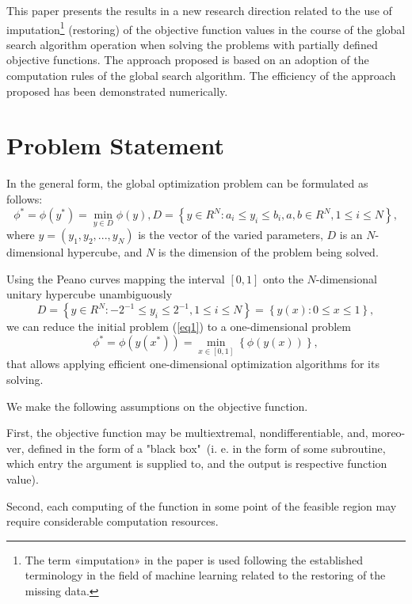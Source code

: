 \documentclass[runningheads]{llncs}
\begin{document}
This paper presents the results in a new research direction related to the use of imputation\footnote{The term «imputation» in the paper is used following the established terminology in the field of machine learning related to the restoring of the missing data.} (restoring) of the objective function values in the course of the global search algorithm operation when solving the problems with partially defined objective functions. The approach proposed is based on an adoption of the computation rules of the global search algorithm. The efficiency of the approach proposed has been demonstrated numerically.

\section{Problem Statement}
In the general form, the global optimization problem can be formulated as follows:
\begin{equation}\label{eq1} 
\phi^*=\phi(y^* )=\min_{y \in D} \phi(y), D=\left\{ y \in R^N: a_i \leq y_i \leq b_i, a,b \in R^N,1 \leq i \leq N \right\},
\end{equation}
where $y=(y_1,y_2,...,y_N)$ is the vector of the varied parameters, $D$ is an $N$-dimensional hypercube, and $N$ is the dimension of the problem being solved.

Using the Peano curves mapping the interval $[0,1]$ onto the $N$-dimensional unitary hypercube unambiguously
$$
D=\left\{ y \in R^N: -2^{-1} \leq y_i \leq 2^{-1}, 1 \leq i \leq N \right\} = \left\{ y(x): 0 \leq x \leq 1 \right\},
$$
we can reduce the initial problem (\ref{eq1}) to a one-dimensional problem
\begin{equation}\label{eq2} 
\phi^*=\phi(y(x^* ))=\min_{x \in [0,1]} \left\{ \phi(y(x)) \right\},
\end{equation}
that allows applying efficient one-dimensional optimization algorithms for its solving.

We make the following assumptions on the objective function. 

First, the objective function may be multiextremal, nondifferentiable, and, moreo-ver, defined in the form of a "black box"\ (i. e. in the form of some subroutine, which entry the argument is supplied to, and the output is respective function value).

Second, each computing of the function in some point of the feasible region may require considerable computation resources.
\end{document}
